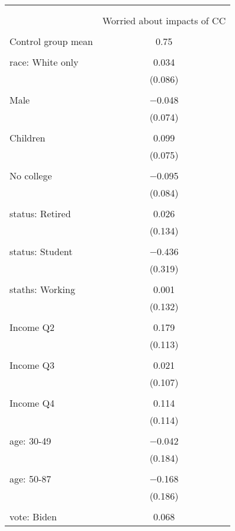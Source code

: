
\begin{tabular}{@{\extracolsep{5pt}}lc} 
\\[-1.8ex]\hline 
\hline \\[-1.8ex] 
\\[-1.8ex] & Worried about impacts of CC \\ 
\hline \\[-1.8ex] 
 Control group mean & 0.75  \\ \hline \\[-1.8ex] race: White only & 0.034 \\ 
  & (0.086) \\ 
  & \\ 
 Male & $-$0.048 \\ 
  & (0.074) \\ 
  & \\ 
 Children & 0.099 \\ 
  & (0.075) \\ 
  & \\ 
 No college & $-$0.095 \\ 
  & (0.084) \\ 
  & \\ 
 status: Retired & 0.026 \\ 
  & (0.134) \\ 
  & \\ 
 status: Student & $-$0.436 \\ 
  & (0.319) \\ 
  & \\ 
 staths: Working & 0.001 \\ 
  & (0.132) \\ 
  & \\ 
 Income Q2 & 0.179 \\ 
  & (0.113) \\ 
  & \\ 
 Income Q3 & 0.021 \\ 
  & (0.107) \\ 
  & \\ 
 Income Q4 & 0.114 \\ 
  & (0.114) \\ 
  & \\ 
 age: 30-49 & $-$0.042 \\ 
  & (0.184) \\ 
  & \\ 
 age: 50-87 & $-$0.168 \\ 
  & (0.186) \\ 
  & \\ 
 vote: Biden & 0.068 \\ 

\end{tabular}
